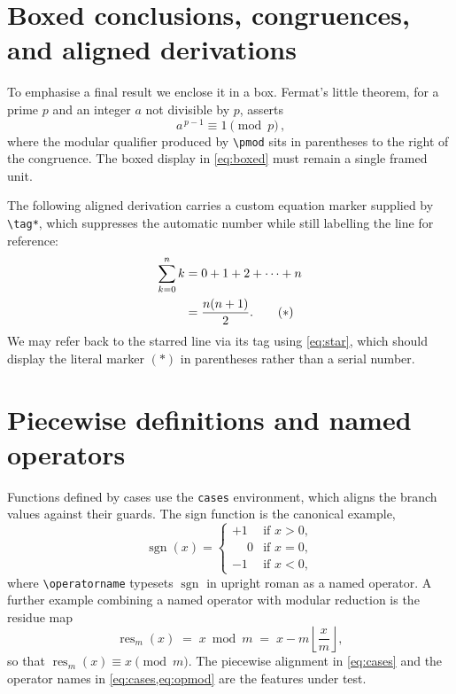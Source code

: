 \documentclass[11pt]{article}
\begin{document}
\section{Boxed conclusions, congruences, and aligned derivations}
\label{sec:align}

To emphasise a final result we enclose it in a box. Fermat's little theorem, for
a prime $p$ and an integer $a$ not divisible by $p$, asserts
\begin{equation}
\label{eq:boxed}
\boxed{\,a^{\,p-1} \equiv 1 \pmod{p}\,},
\end{equation}
where the modular qualifier produced by \verb|\pmod| sits in parentheses to the
right of the congruence. The boxed display in \cref{eq:boxed} must remain a
single framed unit.

The following aligned derivation carries a custom equation marker supplied by
\verb|\tag*|, which suppresses the automatic number while still labelling the
line for reference:
\begin{align}
\label{eq:star}
\sum_{k=0}^{n} k
&= 0 + 1 + 2 + \dots + n \notag \\
&= \frac{n(n+1)}{2}. \tag*{($\ast$)}
\end{align}
We may refer back to the starred line via its tag using \eqref{eq:star}, which
should display the literal marker $(\ast)$ in parentheses rather than a serial
number.

\section{Piecewise definitions and named operators}
\label{sec:cases}

Functions defined by cases use the \texttt{cases} environment, which aligns the
branch values against their guards. The sign function is the canonical example,
\begin{equation}
\label{eq:cases}
\operatorname{sgn}(x) =
\begin{cases}
  +1 & \text{if } x > 0, \\
  \phantom{+}0 & \text{if } x = 0, \\
  -1 & \text{if } x < 0,
\end{cases}
\end{equation}
where \verb|\operatorname| typesets \(\operatorname{sgn}\) in upright roman as a
named operator. A further example combining a named operator with modular
reduction is the residue map
\begin{equation}
\label{eq:opmod}
\operatorname{res}_m(x) \;=\; x \bmod m
\;=\; x - m \left\lfloor \frac{x}{m} \right\rfloor ,
\end{equation}
so that $\operatorname{res}_m(x) \equiv x \pmod{m}$. The piecewise alignment in
\cref{eq:cases} and the operator names in \cref{eq:cases,eq:opmod} are the
features under test.
\end{document}
